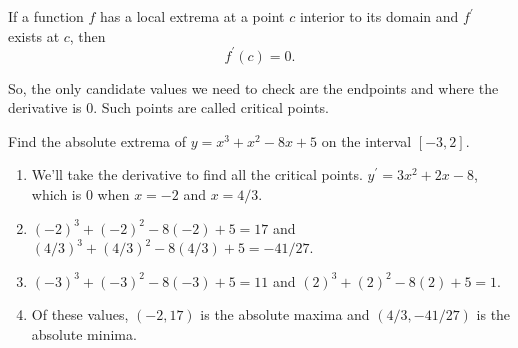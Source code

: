 \begin{theorem}
	If a function $f$ has a local extrema at a point $c$ interior to its domain and $f^\prime$ exists at $c$, then
	\begin{equation*}
		f^\prime(c) = 0.
	\end{equation*}
\end{theorem}
\noindent
So, the only candidate values we need to check are the endpoints and where the derivative is 0.
Such points are called critical points.

\begin{example}
	Find the absolute extrema of $y = x^3 + x^2 - 8x + 5$ on the interval $[-3,2]$.
\end{example}
\begin{enumerate}
	\item We'll take the derivative to find all the critical points.
			$y^\prime = 3x^2 + 2x - 8$, which is 0 when $x=-2$ and $x=4/3$.
	\item $(-2)^3 + (-2)^2 - 8(-2) + 5 = 17$ and $(4/3)^3 + (4/3)^2 - 8(4/3) + 5 = -41/27$.
	\item $(-3)^3 + (-3)^2 - 8(-3) + 5 = 11$ and $(2)^3 + (2)^2 - 8(2) + 5 = 1$.
	\item Of these values, $(-2,17)$ is the absolute maxima and $(4/3, -41/27)$ is the absolute minima.
\end{enumerate}